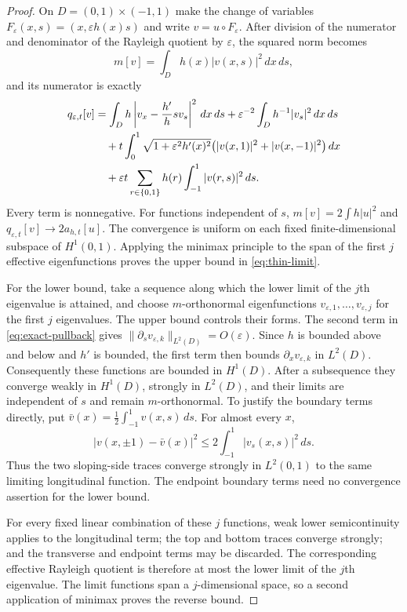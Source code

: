 \documentclass[11pt,a4paper]{article}
\theoremstyle{definition}\newtheorem{definition}[theorem]{Definition}
\theoremstyle{remark}\newtheorem{remark}[theorem]{Remark}
\begin{document}
\begin{proof}
On $D=(0,1)\times(-1,1)$ make the change of variables
$F_\varepsilon(x,s)=(x,\varepsilon h(x)s)$ and write
$v=u\circ F_\varepsilon$. After division of the numerator and
denominator of the Rayleigh quotient by $\varepsilon$, the squared
norm becomes
\[
 m[v]=\int_D h(x)|v(x,s)|^2\,dx\,ds,
\]
and its numerator is exactly
\begin{align}
 q_{\varepsilon,t}[v]
 &=\int_D h\left|v_x-\frac{h'}h s v_s\right|^2\,dx\,ds
  +\varepsilon^{-2}\int_Dh^{-1}|v_s|^2\,dx\,ds\notag\\
 &\quad+t\int_0^1\sqrt{1+\varepsilon^2h'(x)^2}
       \bigl(|v(x,1)|^2+|v(x,-1)|^2\bigr)\,dx\notag\\
 &\quad+\varepsilon t\sum_{r\in\{0,1\}}h(r)
                   \int_{-1}^1|v(r,s)|^2\,ds.
 \label{eq:exact-pullback}
\end{align}
Every term is nonnegative. For functions independent of $s$,
$m[v]=2\int h|u|^2$ and $q_{\varepsilon,t}[v]\to2a_{h,t}[u]$.
The convergence is uniform on each fixed finite-dimensional subspace
of $H^1(0,1)$. Applying the minimax principle to the span of the
first $j$ effective eigenfunctions proves the upper bound in
\eqref{eq:thin-limit}.

For the lower bound, take a sequence along which the lower limit
of the $j$th eigenvalue is attained, and choose $m$-orthonormal
eigenfunctions $v_{\varepsilon,1},\ldots,v_{\varepsilon,j}$ for the
first $j$ eigenvalues. The upper bound controls their forms. The
second term in \eqref{eq:exact-pullback} gives
$\|\partial_sv_{\varepsilon,k}\|_{L^2(D)}=O(\varepsilon)$.
Since $h$ is bounded above and below and $h'$ is bounded, the first
term then bounds $\partial_xv_{\varepsilon,k}$ in $L^2(D)$.
Consequently these functions are bounded in $H^1(D)$. After a
subsequence they converge weakly in $H^1(D)$, strongly in $L^2(D)$,
and their limits are independent of $s$ and remain
$m$-orthonormal. To justify the boundary terms directly, put
$\bar v(x)=\tfrac12\int_{-1}^1v(x,s)\,ds$. For almost every $x$,
\[
 |v(x,\pm1)-\bar v(x)|^2
 \leq2\int_{-1}^1|v_s(x,s)|^2\,ds.
\]
Thus the two sloping-side traces converge strongly in $L^2(0,1)$
to the same limiting longitudinal function. The endpoint
boundary terms need no convergence assertion for the lower bound.

For every fixed linear combination of these $j$ functions, weak
lower semicontinuity applies to the longitudinal term; the
top and bottom traces converge strongly; and the transverse and
endpoint terms may be discarded. The corresponding effective
Rayleigh quotient is therefore at most the lower limit of the
$j$th eigenvalue. The limit functions span a $j$-dimensional space,
so a second application of minimax proves the reverse bound.
\end{proof}
\end{document}
